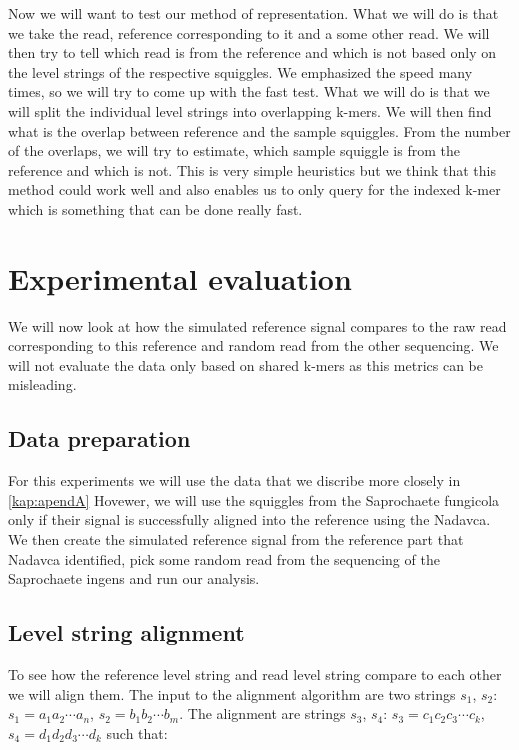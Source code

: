 Now we will want to test our method of representation. What we will do is that we
take the read, reference corresponding to it and a some other read. We will then
try to tell which read is from the reference and which is not based only on the
level strings of the respective squiggles. We emphasized the speed many times, so
we will try to come up with the fast test. What we will do is that we will split the
individual level strings into overlapping k-mers. We will then find what is the overlap
between reference and the sample squiggles. From the number of the overlaps, we will try
to estimate, which sample squiggle is from the reference and which is not. This is very
simple heuristics but we think that this method could work well and also enables us
to only query for the indexed k-mer which is something that can be done really fast.

\section{Experimental evaluation}

We will now look at how the simulated reference signal compares to the raw read
corresponding to this reference and random read from the other sequencing. We will
not evaluate the data only based on shared k-mers as this metrics can be misleading.

\subsection{Data preparation}

For this experiments we will use the data that we discribe more closely in \ref{kap:apendA}
Hovewer, we will use the squiggles from the Saprochaete fungicola only if their signal
is successfully aligned into the reference using the Nadavca. We then create the
simulated reference signal from the reference part that Nadavca identified, pick
some random read from the sequencing of the Saprochaete ingens and run our analysis.

\subsection{Level string alignment}

To see how the reference level string and read level string compare to each other
we will align them. The input to the alignment algorithm are two strings $s_1$, $s_2$:
$s_1=a_1a_2\cdots a_n$, $s_2=b_1b_2\cdots b_m$. The alignment are strings
$s_3$, $s_4$: $s_3 = c_1c_2c_3\cdots c_k$, $s_4 = d_1d_2d_3\cdots d_k$
such that:

